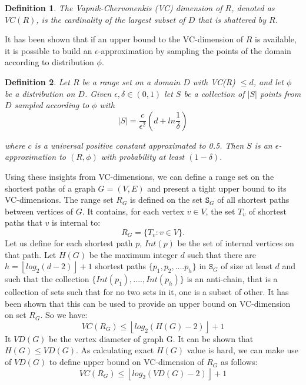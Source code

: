 \documentclass[runningheads,a4paper]{llncs}
\newtheorem{mydef}{Definition}
\begin{document}
\begin{mydef}
The \textit{Vapnik-Chervonenkis} (VC) dimension of $R$, denoted as $VC(R)$, is the cardinality of the largest subset of $D$ that is shattered by $R$.
\end{mydef}

It has been shown that if an upper bound to the VC-dimension of $R$ is available, it is possible to build an $\epsilon$-approximation by sampling the points of the domain according to distribution $\phi$.

\begin{mydef}
Let $R$ be a range set on a domain $D$ with VC(R) $\leq d$, and let $\phi$ be a distribution on $D$. Given $\epsilon, \delta \in (0,1)$ let $S$ be a collection of $|S|$ points from $D$ sampled according to $\phi$ with
\begin{equation} \label{sample_size}
|S| = \frac{c}{\epsilon^{2}}(d + ln\frac{1}{\delta})
\end{equation}

where $c$ is a universal positive constant approximated to 0.5. Then $S$ is an $\epsilon$-approximation to $(R,\phi)$ with probability at least $(1-\delta)$.
\end{mydef}

Using these insights from VC-dimensions, we can define a range set on the shortest paths of a graph $G = (V,E)$ and present a tight upper bound to its VC-dimensions. The range set $R_{G}$ is defined on the set $\mathtt{S}_{G}$ of all shortest paths between vertices of $G$. It contains, for each vertex $v \in V$, the set $T_{v}$ of shortest paths that $v$ is internal to: 
$$R_{G} = \{T_{v} : v \in V\}.$$
Let us define for each shortest path $p$, $Int(p)$ be the set of internal vertices on that path.  Let $H(G)$ be the maximum integer $d$ such that there are $h = \left\lfloor{log_{2}(d-2)}\right\rfloor + 1$ shortest paths $\{p_{1},p_{2},....p_{h}\}$
in $\mathtt{S}_{G}$ of size at least $d$ and such that the collection $\{Int(p_{1}),....,Int(p_{h})\}$ is an anti-chain, that is a collection of sets such that for no two sets in it, one is a subset of other. It has been shown that this can be used to provide an upper bound on VC-dimension on set $R_{G}$. So we have:
$$VC(R_{G}) \leq \left\lfloor{log_{2}(H(G) - 2)}\right\rfloor + 1$$
It $VD(G)$ be the vertex diameter of graph G. It can be shown that $H(G) \leq VD(G)$. As calculating exact $H(G)$ value is hard, we can make use of $VD(G)$ to define upper bound on VC-dimension of $R_{G}$ as follows:
$$VC(R_{G}) \leq \left\lfloor{log_{2}(VD(G) - 2)}\right\rfloor + 1$$
\end{document}
